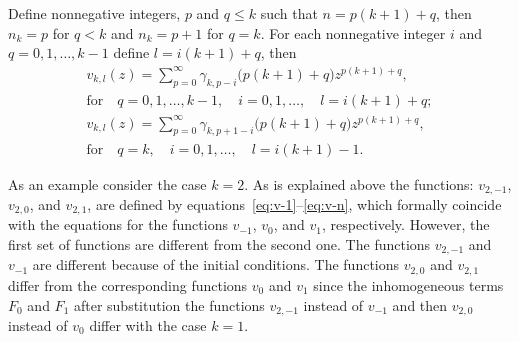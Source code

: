 \documentclass[pdftex]{sigma}
\numberwithin{equation}{section}
\begin{document}
Define nonnegative integers, $p$ and $q\leq k$ such that $n=p(k+1)+q$, then $n_k=p$ for $q<k$ and $n_k=p+1$ for $q=k$.
For each nonnegative integer $i$ and $q=0,1,\ldots,k-1$ define $l=i(k+1)+q$, then
\begin{gather}
v_{k,l}(z) =\sum\limits_{p=0}^\infty\gamma_{k,p-i}\big(p(k+1)+q\big)z^{p(k+1)+q},\label{eq:v-kl-q<k}\\
\mathrm{for}\quad
 q=0,1,\ldots,k-1,\quad
i=0,1,\ldots,\quad
l=i(k+1)+q;\label{eq:l-for-q<k}\\
v_{k,l}(z) =\sum\limits_{p=0}^\infty\gamma_{k,p+1-i}\big(p(k+1)+q\big)z^{p(k+1)+q},\label{eq:v-kl-q=k}\\
\mathrm{for}\quad
 q=k,\quad
i=0,1,\ldots,\quad
l=i(k+1)-1.\label{eq:l-for-q=k}
\end{gather}

As an example consider the case $k=2$. As is explained above the functions: $v_{2,-1}$, $v_{2,0}$, and $v_{2,1}$, are
defined by equations~\eqref{eq:v-1}--\eqref{eq:v-n}, which formally coincide with the equations for the functions
$v_{-1}$, $v_0$, and $v_1$, respectively. However, the first set of functions are different from the second one.
The functions $v_{2,-1}$ and $v_{-1}$ are different because of the initial conditions. The functions $v_{2,0}$ and $v_{2,1}$
differ from the corresponding functions $v_0$ and $v_1$ since the inhomogeneous terms $F_0$ and $F_1$ after substitution
the functions $v_{2,-1}$ instead of $v_{-1}$ and then $v_{2,0}$ instead of $v_0$ differ with the case $k=1$.
\end{document}
